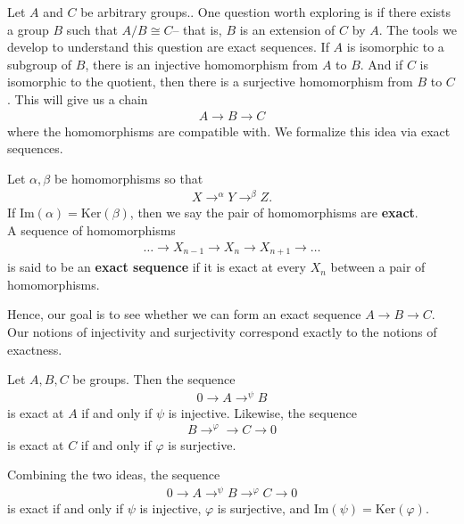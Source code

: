 \documentclass{memoir}
\begin{document}


Let \(A\) and \(C\) be arbitrary groups.. One question worth exploring is if there exists a group \(B\) such that \(A / B \cong C\)-- that is, \(B\) is an extension of \(C\) by \(A\). The tools we develop to understand this question are exact sequences. If \(A\) is isomorphic to a subgroup of \(B \), there is an injective homomorphism from \(A\) to \(B\). And if \(C\) is isomorphic to the quotient, then there is a surjective homomorphism from \(B\) to \(C\). This will give us a chain
\begin{align*}
	A \to B \to C
\end{align*}
where the homomorphisms are compatible with. We formalize this idea via exact sequences.

\begin{defn}
	Let \(\alpha ,\beta \) be homomorphisms so that
	\begin{align*}
		X \to^{\alpha } Y \to^{\beta }Z.
	\end{align*}
	If \(\textrm{Im}(\alpha ) = \textrm{Ker}(\beta )\), then we say the pair of homomorphisms are \textbf{exact}.\\

	A sequence of homomorphisms
	\begin{align*}
		\ldots \to X_{n-1} \to X_n \to X_{n+1} \to \ldots
	\end{align*}
	is said to be an \textbf{exact sequence} if it is exact at every \(X_n\) between a pair of homomorphisms.
\end{defn}
Hence, our goal is to see whether we can form an exact sequence \(A\to B\to C\). Our notions of injectivity and surjectivity correspond exactly to the notions of exactness.
\begin{prop}
	Let \(A,B,C\) be groups. Then the sequence
	\begin{align*}
		0 \to A \to^{\psi }B
	\end{align*}
	is exact at \(A\) if and only if \(\psi \) is injective. Likewise, the sequence
	\begin{align*}
		B \to^{\varphi }\to C \to 0
	\end{align*}
	is exact at \(C\) if and only if \(\varphi \) is surjective.
\end{prop}
Combining the two ideas, the sequence
\begin{align*}
	0 \to A \to^{\psi }B \to^{\varphi }C \to 0
\end{align*}
is exact if and only if \(\psi \) is injective, \(\varphi \) is surjective, and \(\textrm{Im}(\psi ) = \textrm{Ker}(\varphi )\).
\end{document}
